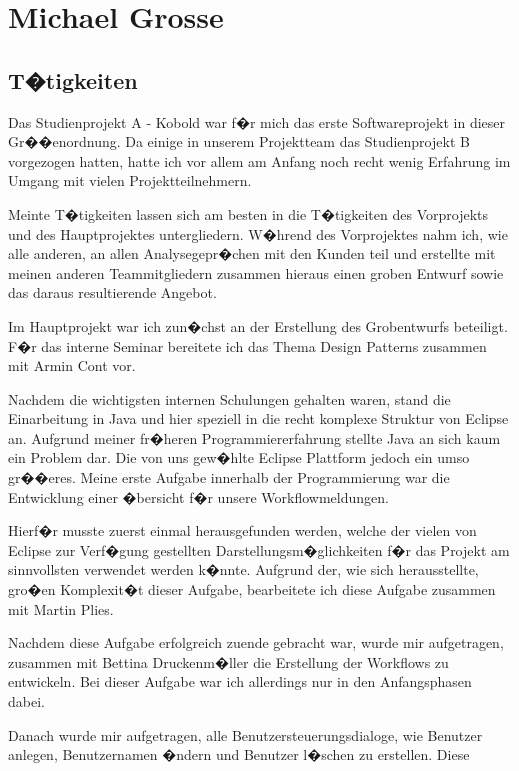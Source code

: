 \section{Michael Grosse}


\subsection{T�tigkeiten}
Das Studienprojekt A - Kobold war f�r mich das erste Softwareprojekt in
dieser Gr��enordnung. Da einige in unserem Projektteam das Studienprojekt B
vorgezogen hatten, hatte ich vor allem am Anfang noch recht wenig Erfahrung
im Umgang mit vielen Projektteilnehmern.\par
Meinte T�tigkeiten lassen sich am besten in die T�tigkeiten des Vorprojekts
und des Hauptprojektes untergliedern. W�hrend des Vorprojektes nahm ich, wie
alle anderen, an allen Analysegepr�chen mit den Kunden teil und erstellte
mit meinen anderen Teammitgliedern zusammen hieraus einen groben Entwurf
sowie das daraus resultierende Angebot.\par
Im Hauptprojekt war ich zun�chst an der Erstellung des Grobentwurfs
beteiligt. F�r das interne Seminar bereitete ich das Thema Design Patterns
zusammen mit Armin Cont vor.\par
Nachdem die wichtigsten internen Schulungen gehalten waren, stand die
Einarbeitung in Java und hier speziell in die recht komplexe Struktur von
Eclipse an. Aufgrund meiner fr�heren Programmiererfahrung stellte Java an
sich kaum ein Problem dar. Die von uns gew�hlte Eclipse Plattform jedoch ein
umso gr��eres. Meine erste Aufgabe innerhalb der Programmierung war die
Entwicklung einer �bersicht f�r unsere Workflowmeldungen.\par
Hierf�r musste zuerst einmal herausgefunden werden, welche der vielen von
Eclipse zur Verf�gung gestellten Darstellungsm�glichkeiten f�r das Projekt
am sinnvollsten verwendet werden k�nnte. Aufgrund der, wie sich
herausstellte, gro�en Komplexit�t dieser Aufgabe, bearbeitete ich diese
Aufgabe zusammen mit Martin Plies.\par
Nachdem diese Aufgabe erfolgreich zuende gebracht war, wurde mir
aufgetragen, zusammen mit Bettina Druckenm�ller die Erstellung der Workflows
zu entwickeln. Bei dieser Aufgabe war ich allerdings nur in den
Anfangsphasen dabei.\par
Danach wurde mir aufgetragen, alle Benutzersteuerungsdialoge, wie Benutzer
anlegen, Benutzernamen �ndern und Benutzer l�schen zu erstellen. Diese
